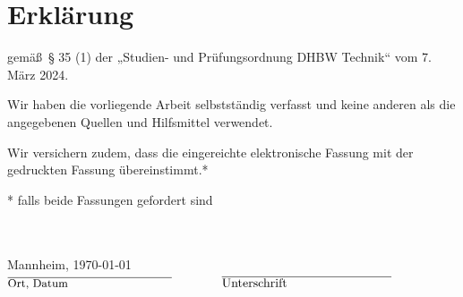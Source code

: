 
\section*{Erklärung}
gemäß\ § 35 (1) der „Studien- und Prüfungsordnung DHBW Technik“ vom 7. März 2024.\newline 


\noindent Wir haben die vorliegende Arbeit selbstständig verfasst und keine anderen als die angegebenen Quellen und Hilfsmittel verwendet.\newline

\noindent Wir versichern zudem, dass die eingereichte elektronische Fassung mit der gedruckten Fassung übereinstimmt.*\\ 
\begin{footnotesize}
	* falls beide Fassungen gefordert sind
\end{footnotesize}
\\ \\
Mannheim, \today \\
$\overline{\text{\small Ort, Datum \normalsize \hspace{8em}}} \hspace{4em} \overline{\text{Unterschrift \hspace{8em}}}$
